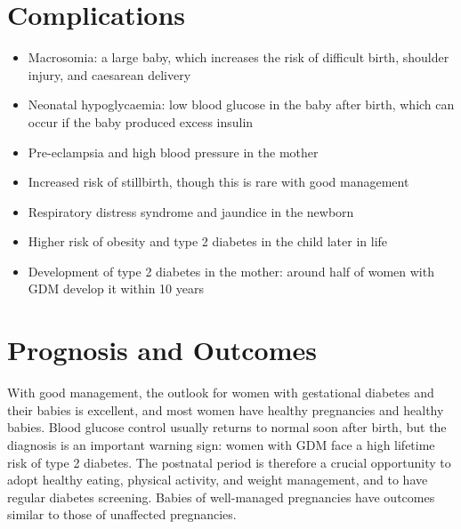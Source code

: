 \section*{Complications}
\begin{itemize}
    \item Macrosomia: a large baby, which increases the risk of difficult birth, shoulder injury, and caesarean delivery
    \item Neonatal hypoglycaemia: low blood glucose in the baby after birth, which can occur if the baby produced excess insulin
    \item Pre-eclampsia and high blood pressure in the mother
    \item Increased risk of stillbirth, though this is rare with good management
    \item Respiratory distress syndrome and jaundice in the newborn
    \item Higher risk of obesity and type 2 diabetes in the child later in life
    \item Development of type 2 diabetes in the mother: around half of women with GDM develop it within 10 years
\end{itemize}

\section*{Prognosis and Outcomes}
With good management, the outlook for women with gestational diabetes and their babies is excellent, and most women have healthy pregnancies and healthy babies. Blood glucose control usually returns to normal soon after birth, but the diagnosis is an important warning sign: women with GDM face a high lifetime risk of type 2 diabetes. The postnatal period is therefore a crucial opportunity to adopt healthy eating, physical activity, and weight management, and to have regular diabetes screening. Babies of well-managed pregnancies have outcomes similar to those of unaffected pregnancies.

